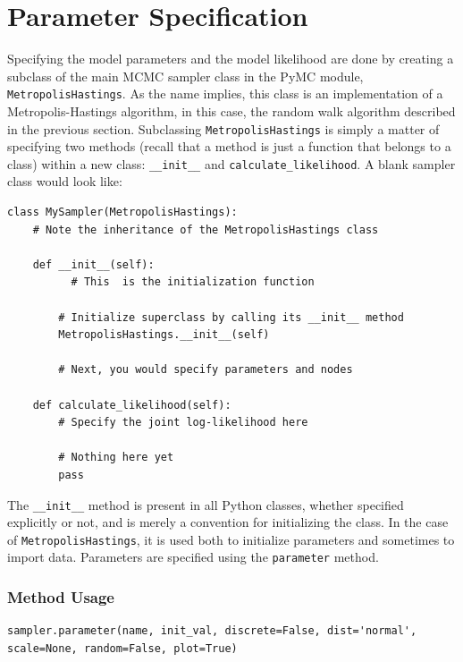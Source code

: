 \documentclass[]{book}
\begin{document}
\section{Parameter Specification}\label{sec:parameter_specification}

Specifying the model parameters and the model likelihood are done by creating a subclass of the main MCMC sampler class in the PyMC module, \verb=MetropolisHastings=. As the name implies, this class is an implementation of a Metropolis-Hastings algorithm, in this case, the random walk algorithm described in the previous section. Subclassing \verb=MetropolisHastings= is simply a matter of specifying two methods (recall that a method is just a function that belongs to a class) within a new class: \verb=__init__= and \verb=calculate_likelihood=. A blank sampler class would look like:

\begin{verbatim}
class MySampler(MetropolisHastings):
    # Note the inheritance of the MetropolisHastings class

    def __init__(self):
          # This  is the initialization function

        # Initialize superclass by calling its __init__ method
        MetropolisHastings.__init__(self)

        # Next, you would specify parameters and nodes

    def calculate_likelihood(self):
        # Specify the joint log-likelihood here

        # Nothing here yet
        pass

\end{verbatim}

The \verb=__init__= method is present in all Python classes, whether specified explicitly or not, and is merely a convention for initializing the class. In the case of \verb=MetropolisHastings=, it is used both to initialize parameters and sometimes to import data. Parameters are specified using the \verb=parameter= method.

\subsubsection*{Method Usage}
\begin{verbatim}
sampler.parameter(name, init_val, discrete=False, dist='normal',
scale=None, random=False, plot=True)
\end{verbatim}
\end{document}
